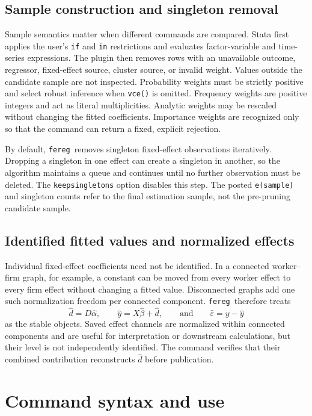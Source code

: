 \documentclass[11pt]{article}
\newcommand{\fereg}{\texttt{fereg}}
\begin{document}
\subsection{Sample construction and singleton removal}

Sample semantics matter when different commands are compared.  Stata first
applies the user's \texttt{if} and \texttt{in} restrictions and evaluates
factor-variable and time-series expressions.  The plugin then removes rows
with an unavailable outcome, regressor, fixed-effect source, cluster source,
or invalid weight.  Values outside the candidate sample are not inspected.
Probability weights must be strictly positive and select robust inference
when \texttt{vce()} is omitted.  Frequency weights are positive integers and
act as literal multiplicities.  Analytic weights may be rescaled without
changing the fitted coefficients.  Importance weights are recognized only so
that the command can return a fixed, explicit rejection.

By default, \fereg\ removes singleton fixed-effect observations iteratively.
Dropping a singleton in one effect can create a singleton in another, so the
algorithm maintains a queue and continues until no further observation must
be deleted.  The \texttt{keepsingletons} option disables this step.  The
posted \texttt{e(sample)} and singleton counts refer to the final estimation
sample, not the pre-pruning candidate sample.

\subsection{Identified fitted values and normalized effects}

Individual fixed-effect coefficients need not be identified.  In a connected
worker--firm graph, for example, a constant can be moved from every worker
effect to every firm effect without changing a fitted value.  Disconnected
graphs add one such normalization freedom per connected component.
\fereg\ therefore treats
\[
  \widehat d=D\widehat\alpha,\qquad
  \widehat y=X\widehat\beta+\widehat d,
  \qquad\text{and}\qquad
  \widehat\varepsilon=y-\widehat y
\]
as the stable objects.  Saved effect channels are normalized within connected
components and are useful for interpretation or downstream calculations, but
their level is not independently identified.  The command verifies that
their combined contribution reconstructs $\widehat d$ before publication.

\section{Command syntax and use}
\label{sec:syntax}
\end{document}
